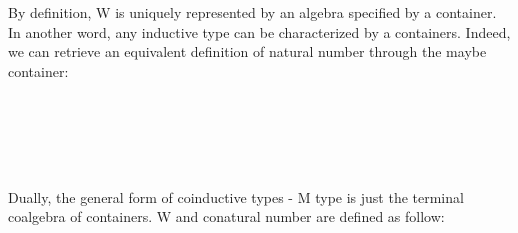 By definition, W is uniquely represented by an algebra specified by a container. In another word, any inductive type can be characterized by a containers. Indeed, we can retrieve an equivalent definition of natural number through the maybe container:

\begin{code}%
\>[0]\AgdaSpace{}%
\AgdaSymbol{:}\AgdaSpace{}%
\<%
\\
\>[0]\AgdaSpace{}%
\AgdaSymbol{=}\AgdaSpace{}%
\AgdaSymbol{(}\AgdaSpace{}%
\AgdaSpace{}%
\AgdaSymbol{)}\AgdaSpace{}%
\AgdaSpace{}%
\AgdaSpace{}%
\AgdaSymbol{(}\AgdaSpace{}%
\AgdaSymbol{)}\AgdaSpace{}%
\AgdaSpace{}%
\AgdaSpace{}%
\AgdaSymbol{;}\AgdaSpace{}%
\AgdaSymbol{(}\AgdaSpace{}%
\AgdaSymbol{)}\AgdaSpace{}%
\AgdaSpace{}%
\AgdaSpace{}%
\AgdaSymbol{\}}\<%
\\
%
\\[\AgdaEmptyExtraSkip]%
\>[0]\AgdaSpace{}%
\AgdaSymbol{:}\AgdaSpace{}%
\<%
\\
\>[0]\AgdaSpace{}%
\AgdaSymbol{=}\AgdaSpace{}%
\AgdaSpace{}%
\<%
\end{code}

Dually, the general form of coinductive types - M type is just the terminal coalgebra of containers. W and conatural number are defined as follow:

\begin{code}%
\>[0]\AgdaSpace{}%
\AgdaSpace{}%
\AgdaSymbol{(}\AgdaSpace{}%
\AgdaSymbol{:}\AgdaSpace{}%
\AgdaSymbol{)}\AgdaSpace{}%
\AgdaSymbol{:}\AgdaSpace{}%
\AgdaSpace{}%
\<%
\\
\>[0][@{}l@{\AgdaIndent{0}}]%
\>[2]\<%
\\
%
\>[2]\<%
\\
\>[2][@{}l@{\AgdaIndent{0}}]%
\>[4]\AgdaSpace{}%
\AgdaSymbol{:}\AgdaSpace{}%
\AgdaSpace{}%
\AgdaSpace{}%
\AgdaSpace{}%
\AgdaSymbol{(}\AgdaSpace{}%
\AgdaSymbol{)}\<%
\\
\>[0]\AgdaSpace{}%
\<%
\\
%
\\[\AgdaEmptyExtraSkip]%
\>[0]\AgdaSpace{}%
\AgdaSymbol{:}\AgdaSpace{}%
\<%
\\
\>[0]\AgdaSpace{}%
\AgdaSymbol{=}\AgdaSpace{}%
\AgdaSpace{}%
\<%
\end{code}

